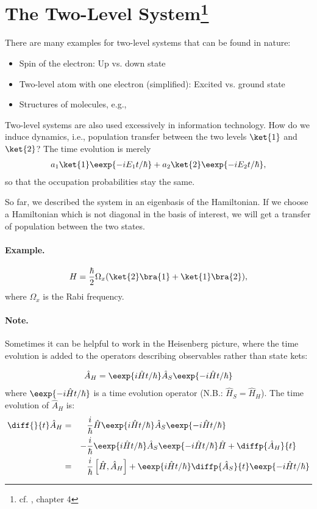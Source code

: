 
	\section[The Two-Level System]{The Two-Level System\footnote{cf. \cite{cohen}, chapter 4}}

		There are many examples for two-level systems that can be found in nature:
		\begin{itemize}
			\item Spin of the electron: Up vs. down state
			\item Two-level atom with one electron (simplified): Excited vs. ground state
			\item Structures of molecules, e.g., \hyperref[fig:twostate]{}
		\end{itemize}
		Two-level systems are also used excessively in information technology.
		How do we induce dynamics, i.e., population transfer between the two levels $\ket{1}$ and $\ket{2}$? The time evolution is merely
		\begin{align}
			a_1\ket{1}\eexp{-i{E_1 t}/{\hbar}} + a_2\ket{2}\eexp{-i{E_2 t}/{\hbar}},
		\end{align}
		so that the occupation probabilities stay the same. 
		
		So far, we described the system in an eigenbasis of the Hamiltonian.
		If we choose a Hamiltonian which is not diagonal in the basis of interest, we will get a transfer of population between the two states.

				\paragraph{Example.}
					\begin{align}
						H=\frac{\hbar}{2}\Omega_x(\ket{2}\bra{1} + \ket{1}\bra{2}),
					\end{align}
					where $\Omega_x$ is the Rabi frequency.

				\paragraph{Note.} Sometimes it can be helpful to work in the Heisenberg picture, where the time evolution is added to the operators describing observables rather than state kets:

					\begin{align}
						\hat{A}_H=\eexp{i{\hat{H} t}/{\hbar}} \hat{A}_S \eexp{-i{\hat{H} t}/{\hbar}}
					\end{align}
					where $\eexp{-i{\hat{H} t}/{\hbar}}$ is a time evolution operator (N.B.: $\hat{H}_S = \hat{H}_H$). The time evolution of $\hat{A}_H$ is:
					\begin{align}
						\notag \diff{}{t} \hat{A}_H &=&& \frac{i}{\hbar}\hat{H}\eexp{i{\hat{H}t}/{\hbar}}\hat{A}_S \eexp{-i{\hat{H} t}/{\hbar}}\\ 
						&&-&\frac{i}{\hbar} \eexp{i{\hat{H} t}/{\hbar}}\hat{A}_S \eexp{-i{\hat{H}t}/{\hbar}}\hat{H}+\diffp{\hat{A}_H}{t}\\
						&=&& \frac{i}{\hbar}\left[\hat{H},\hat{A}_H\right] + \eexp{i{\hat{H}t}/{\hbar}}\diffp{\hat{A}_S}{t}\eexp{-i{\hat{H}t}/{\hbar}}
					\end{align}

